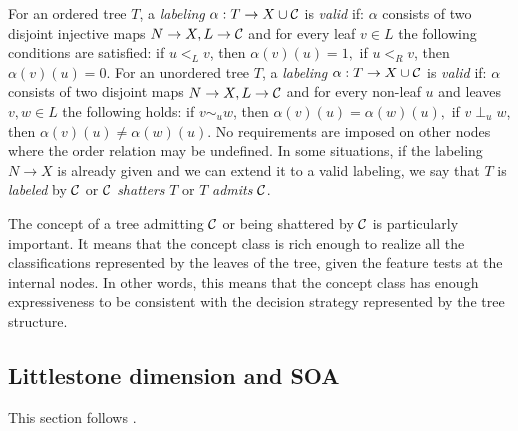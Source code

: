 \begin{definition}
\label{def:labeling}
\begin{outline}
\0 For an ordered tree $T$, a \emph{labeling} $\alpha:T\rightarrow X \cup \mathcal{C}$ is \emph{valid} if:
    \1 $\alpha$ consists of two disjoint injective maps $N\rightarrow X, L\rightarrow \mathcal{C}$ and
    \1 for every leaf $v\in L$ the following conditions are satisfied:
        \2 if $u<_L v$, then $\alpha(v)(u)=1,$
        \2 if $u<_R v$, then $\alpha(v)(u)=0.$
\0 For an unordered tree $T$, a \emph{labeling} $\alpha:T\rightarrow X \cup \mathcal{C}$ is \emph{valid} if:
    \1 $\alpha$ consists of two disjoint maps $N\rightarrow X, L\rightarrow \mathcal{C}$ and
    \1 for every non-leaf $u$ and leaves $v, w\in L$ the following holds:
        \2 if $v \sim_u w$, then $\alpha(v)(u) = \alpha(w)(u),$
        \2 if $v \perp_u w$, then $\alpha(v)(u) \neq \alpha(w)(u).$
\0 No requirements are imposed on other nodes where the order relation may be undefined. In some situations, if the labeling $N\rightarrow X$ is already given and we can extend it to a valid labeling, we say that $T$ is \emph{labeled} by $\mathcal{C}$ or $\mathcal{C}$ \emph{shatters} $T$ or $T$ \emph{admits} $\mathcal{C}$.
\end{outline}
\end{definition}


The concept of a tree admitting $\mathcal{C}$ or being shattered by $\mathcal{C}$ is particularly important. It means that the concept class is rich enough to realize all the classifications represented by the leaves of the tree, given the feature tests at the internal nodes. In other words, this means that the concept class has enough expressiveness to be consistent with the decision strategy represented by the tree structure.

\subsection{Littlestone dimension and SOA}

This section follows \cite{littlestone1988learning}.

